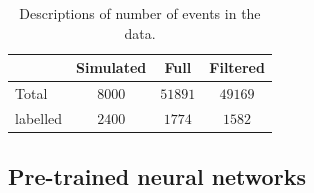 \documentclass[review,number,sort&compress]{elsarticle}
\begin{document}

\begin{table}[hbtp]
\centering
\caption{Descriptions of number of events in the data.}\label{tab:datasets}
\begin{tabular}{lccc}
\toprule
{} & Simulated & Full & Filtered \\
\midrule
Total &  $8000$ & $51891$ & $49169$ \\
labelled & $2400$ & $1774$ &  $1582$ \\ 
\bottomrule
\end{tabular}
\end{table}


\subsection{Pre-trained neural networks}
\end{document}
